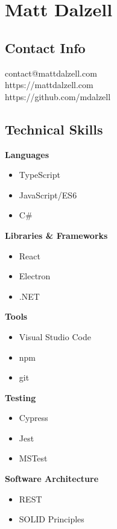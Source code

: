 \documentclass[12pt]{article}
\begin{document}

\section*{Matt Dalzell}

\setlength{\columnsep}{4em}
\setlength{\columnseprule}{0.1pt}
\begin{paracol}{2}

\subsection*{Contact Info}
contact@mattdalzell.com \\ 
https://mattdalzell.com \\
https://github.com/mdalzell 

\subsection*{Technical Skills} 

\textbf{Languages}
\begin{itemize}
    \item TypeScript 
    \item JavaScript/ES6
    \item C\#
\end{itemize}

\noindent \textbf{Libraries \& Frameworks}
\begin{itemize}
    \item React 
    \item Electron
    \item .NET 
\end{itemize}

\noindent \textbf{Tools}
\begin{itemize}
    \item Visual Studio Code
    \item npm
    \item git
\end{itemize}

\noindent \textbf{Testing}
\begin{itemize}
    \item Cypress
    \item Jest
    \item MSTest
\end{itemize}

\noindent \textbf{Software Architecture}
\begin{itemize}
    \item REST
    \item SOLID Principles
\end{itemize}


\end{paracol}
\end{document}

